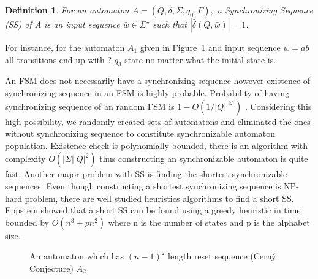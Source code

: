 \documentclass[12pt]{article}
\newtheorem{definition}{Definition}
\begin{document}
\begin{definition}
For an automaton $A = (Q,\delta, \Sigma, q_{0}, F),$ a {\em Synchronizing Sequence (SS)} of $A$ is an input sequence $\bar{w}\in \Sigma^\star$ such that $|\hat{\delta}(Q,\bar{w})| = 1$.
\end{definition}

For instance, for the automaton $A_{1}$ given in Figure~\ref{fig:A0} and input sequence $w = ab$ all transitions end up with ? $q_{3}$ state no matter what the initial state is.

\par An FSM does not necessarily have a synchronizing sequence however existence of synchronizing sequence in an FSM is highly probable. Probability of having synchronizing sequence of an random FSM is $1-O(1/|Q|^{|\Sigma|})$
\cite{berlinkov}. Considering this high possibility, we randomly created sets of automatons and eliminated the ones without synchronizing sequence to constitute synchronizable automaton population. Existence check is polynomially bounded, there is an algorithm with complexity $O(|\Sigma||Q|^2)$ \cite{eppstein_1990} thus constructing an synchronizable automaton is quite fast. Another major problem with SS is finding the shortest synchronizable sequences.  Even though constructing a shortest synchronizing sequence is NP-hard problem, there are well studied heuristics algorithms to find a short SS. Eppstein showed that a short SS can be found using a greedy heuristic in time bounded by $O(n^3 + pn^2)$ where n is the number of states and p is the alphabet size\cite{eppstein_1990}.

\begin{figure}[ht]
	\centering
	\begin{minipage}{.5\textwidth}
		\centering
{}
\caption{An automaton which has $(n-1)^2$ length reset sequence (Cerný Conjecture)  $A_2$}\label{fig:A0}
\end{minipage}
\end{figure}




\newpage


\end{document}
